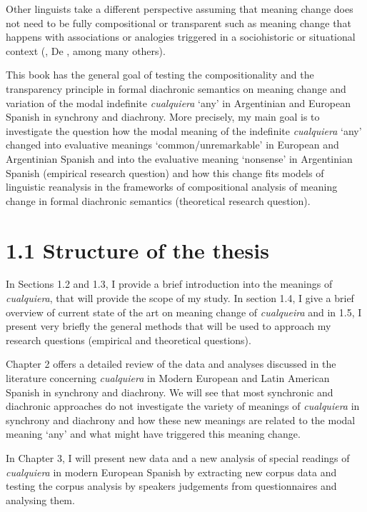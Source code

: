   Other linguists take a different perspective assuming that meaning change does not need to be fully compositional or transparent such as meaning change that happens with associations or analogies triggered in a sociohistoric or situational context (\citealt{CroftCruse2004}, De \citealt{SmetFischer2017}, among many others). 

  This book has the general goal of testing the compositionality and the transparency principle in formal diachronic semantics on meaning change and variation of the modal indefinite \textit{cualquiera} ‘any’ in Argentinian and European Spanish in synchrony and diachrony. More precisely, my main goal is to investigate the question how the modal meaning of the indefinite \textit{cualquiera} ‘any’ changed into evaluative meanings ‘common/unremarkable’ in European and Argentinian Spanish and into the evaluative meaning ‘nonsense’ in Argentinian Spanish (empirical research question) and how this change fits models of linguistic reanalysis in the frameworks of compositional analysis of meaning change in formal diachronic semantics (theoretical research question).

\section{1.1 Structure of the thesis}

In Sections 1.2 and 1.3, I provide a brief introduction into the meanings of \textit{cualquiera}, that will provide the scope of my study. In section 1.4, I give a brief overview of current state of the art on meaning change of \textit{cualqueira} and in 1.5, I present very briefly the general methods that will be used to approach my research questions (empirical and theoretical questions). 

  Chapter 2 offers a detailed review of the data and analyses discussed in the literature concerning \textit{cualquiera} in Modern European and Latin American Spanish in synchrony and diachrony. We will see that most synchronic and diachronic approaches do not investigate the variety of meanings of \textit{cualquiera} in synchrony and diachrony and how these new meanings are related to the modal meaning ‘any’ and what might have triggered this meaning change.

  In Chapter 3, I will present new data and a new analysis of special readings of \textit{cualquiera} in modern European Spanish by extracting new corpus data and testing the corpus analysis by speakers judgements from questionnaires and analysing them.

